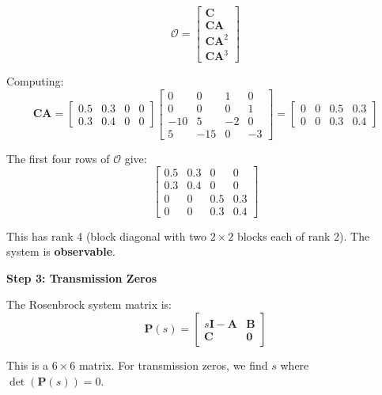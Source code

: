 \begin{equation}
\mathcal{O} = \begin{bmatrix} \mathbf{C} \\ \mathbf{C}\mathbf{A} \\ \mathbf{C}\mathbf{A}^2 \\ \mathbf{C}\mathbf{A}^3 \end{bmatrix}
\end{equation}

Computing:
\begin{equation}
\mathbf{C}\mathbf{A} = \begin{bmatrix} 0.5 & 0.3 & 0 & 0 \\ 0.3 & 0.4 & 0 & 0 \end{bmatrix} \begin{bmatrix} 0 & 0 & 1 & 0 \\ 0 & 0 & 0 & 1 \\ -10 & 5 & -2 & 0 \\ 5 & -15 & 0 & -3 \end{bmatrix} = \begin{bmatrix} 0 & 0 & 0.5 & 0.3 \\ 0 & 0 & 0.3 & 0.4 \end{bmatrix}
\end{equation}

The first four rows of $\mathcal{O}$ give:
\begin{equation}
\begin{bmatrix} 0.5 & 0.3 & 0 & 0 \\ 0.3 & 0.4 & 0 & 0 \\ 0 & 0 & 0.5 & 0.3 \\ 0 & 0 & 0.3 & 0.4 \end{bmatrix}
\end{equation}

This has rank 4 (block diagonal with two $2\times 2$ blocks each of rank 2). The system is \textbf{observable}.

\textbf{Step 3: Transmission Zeros}

The Rosenbrock system matrix is:
\begin{equation}
\mathbf{P}(s) = \begin{bmatrix} s\mathbf{I} - \mathbf{A} & \mathbf{B} \\ \mathbf{C} & \mathbf{0} \end{bmatrix}
\end{equation}

This is a $6 \times 6$ matrix. For transmission zeros, we find $s$ where $\det(\mathbf{P}(s)) = 0$.

